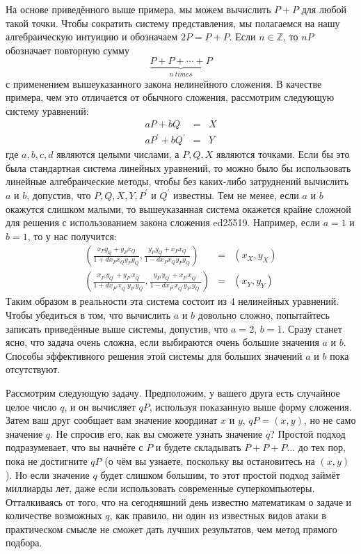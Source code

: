 \documentclass{mrl}
\numberwithin{equation}{section}
\numberwithin{figure}{section}
\begin{document}
На основе приведённого выше примера, мы можем вычислить $P+P$ для любой такой точки. Чтобы сократить систему представления, мы полагаемся на нашу алгебраическую интуицию и обозначаем $2P = P + P$. Если $n\in\mathbb{Z}$, то $nP$ обозначает повторную сумму $$\underbrace{P+P+\cdots+P}_{n\ times}$$ с применением вышеуказанного закона нелинейного сложения. В качестве примера, чем это отличается от обычного сложения, рассмотрим следующую систему уравнений:
\begin{eqnarray*}
aP+bQ&=&X \\
aP^{\prime}+bQ^{\prime}&=&Y
\end{eqnarray*}
где $a,b,c,d$ являются целыми числами, а $P,Q,X$ являются точками. Если бы это была стандартная система линейных уравнений, то можно было бы использовать линейные алгебраические методы, чтобы без каких-либо затруднений вычислить $a$ и $b$, допустив, что $P,Q,X,Y,P^{\prime}$ и $Q^{\prime}$ известны. Тем не менее, если $a$ и $b$ окажутся слишком малыми, то вышеуказанная система окажется крайне сложной для решения с использованием закона сложения ed25519. Например, если $a=1$ и $b=1$, то у нас получится:
\begin{eqnarray*}
\left(\frac{x_{P}y_{Q}+y_{P}x_{Q}}{1+dx_{P}x_{Q}y_{P}y_{Q}},\frac{y_{P}y_{Q}+x_{P}x_{Q}}{1-dx_{P}x_{Q}y_{P}y_{Q}}\right)&=&\left(x_{X},y_{X}\right) \\
\left(\frac{x_{P^{\prime}}y_{Q^{\prime}}+y_{P^{\prime}}x_{Q^{\prime}}}{1+dx_{P^{\prime}}x_{Q^{\prime}}y_{P^{\prime}}y_{Q^{\prime}}},\frac{y_{P^{\prime}}y_{Q^{\prime}}+x_{P^{\prime}}x_{Q^{\prime}}}{1-dx_{P^{\prime}}x_{Q^{\prime}}y_{P^{\prime}}y_{Q^{\prime}}}\right)&=&\left(x_{Y},y_{Y}\right)
\end{eqnarray*}
Таким образом в реальности эта система состоит из $4$ нелинейных уравнений. Чтобы убедиться в том, что вычислить $a$ и $b$ довольно сложно, попытайтесь записать приведённые выше системы, допустив, что $a=2$, $b=1$. Сразу станет ясно, что задача очень сложна, если выбираются очень большие значения $a$ и $b$. Способы эффективного решения этой системы для больших значений $a$ и $b$ пока отсутствуют.

Рассмотрим следующую задачу. Предположим, у вашего друга есть случайное целое число $q$, и он вычисляет $qP$, используя показанную выше форму сложения. Затем ваш друг сообщает вам значение координат $x$ и $y$, $qP=\left(x,y\right)$, но не само значение $q$. Не спросив его, как вы сможете узнать значение $q$? Простой подход подразумевает, что вы начнёте с $P$ и будете складывать $P+P+P...$ до тех пор, пока не достигните $qP$ (о чём вы узнаете, поскольку вы остановитесь на $\left(x,y\right)$). Но если значение $q$ будет слишком большим, то этот простой подход займёт миллиарды лет, даже если использовать современные суперкомпьютеры. Отталкиваясь от того, что на сегодняшний день известно математикам о задаче и количестве возможных $q$, как правило, ни один из известных видов атаки в практическом смысле не сможет дать лучших результатов, чем метод прямого подбора.
\end{document}
